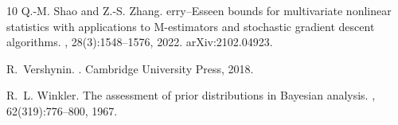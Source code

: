 \documentclass[11pt]{article}
\theoremstyle{remark}
\begin{document}
\begin{thebibliography}{10}
Q.-M. Shao and Z.-S. Zhang.
erry--{E}sseen bounds for multivariate nonlinear statistics with
  applications to {M}-estimators and stochastic gradient descent algorithms.
, 28(3):1548--1576, 2022.
\newblock arXiv:2102.04923.

R.~Vershynin.
.
\newblock Cambridge University Press, 2018.

R.~L. Winkler.
\newblock The assessment of prior distributions in {B}ayesian analysis.
,
  62(319):776--800, 1967.

\end{thebibliography}
\end{document}
